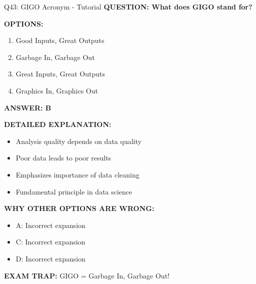 \documentclass[8pt]{beamer}
\begin{document}
	\begin{frame}{Q43: GIGO Acronym - Tutorial}
		\fontsize{6.5}{7.5}\selectfont
		\textbf{QUESTION: What does GIGO stand for?}
		
		\vspace{0.1cm}
		\textbf{OPTIONS:}
		\begin{enumerate}
			\item Good Inputs, Great Outputs
			\item Garbage In, Garbage Out
			\item Great Inputs, Great Outputs
			\item Graphics In, Graphics Out
		\end{enumerate}
		
		\vspace{0.1cm}
		\textcolor{myblue}{\textbf{ANSWER: B}}
		
		\vspace{0.1cm}
		\textbf{DETAILED EXPLANATION:}
		\begin{itemize}
			\item Analysis quality depends on data quality
			\item Poor data leads to poor results
			\item Emphasizes importance of data cleaning
			\item Fundamental principle in data science
		\end{itemize}
		
		\vspace{0.1cm}
		\textcolor{myred}{\textbf{WHY OTHER OPTIONS ARE WRONG:}}
		\begin{itemize}
			\item \textcolor{myred}{A:} Incorrect expansion
			\item \textcolor{myred}{C:} Incorrect expansion
			\item \textcolor{myred}{D:} Incorrect expansion
		\end{itemize}
		
		\textcolor{myred}{\textbf{EXAM TRAP:}} GIGO = \textcolor{myblue}{Garbage In, Garbage Out}!
	\end{frame}
	
\end{document}
